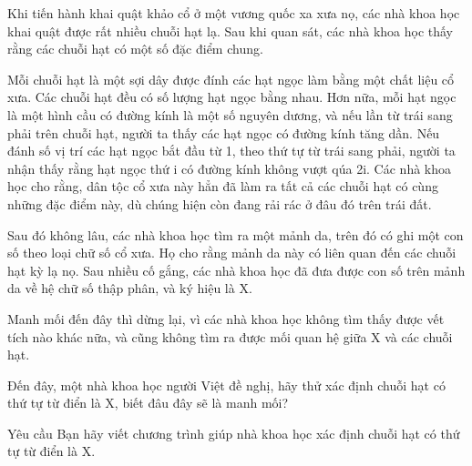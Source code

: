 Khi tiến hành khai quật khảo cổ ở một vương quốc xa xưa nọ, các nhà khoa học khai quật được rất nhiều chuỗi hạt lạ. Sau khi quan sát, các nhà khoa học thấy rằng các chuỗi hạt có một số đặc điểm chung.  

   Mỗi chuỗi hạt là một sợi dây được đính các hạt ngọc làm bằng một chất liệu cổ xưa. Các chuỗi hạt đều có số lượng hạt ngọc bằng nhau. Hơn nữa, mỗi hạt ngọc là một hình cầu có đường kính là một số nguyên dương, và nếu lần từ trái sang phải trên chuỗi hạt, người ta thấy các hạt ngọc có đường kính tăng dần. Nếu đánh số vị trí các hạt ngọc bắt đầu từ 1, theo thứ tự từ trái sang phải, người ta nhận thấy rằng hạt ngọc thứ i có đường kính không vượt qúa 2i. Các nhà khoa học cho rằng, dân tộc cổ xưa này hẳn đã làm ra tất cả các chuỗi hạt có cùng những đặc điểm này, dù chúng hiện còn đang rải rác ở đâu đó trên trái đất.  

   Sau đó không lâu, các nhà khoa học tìm ra một mảnh da, trên đó có ghi một con số theo loại chữ số cổ xưa. Họ cho rằng mảnh da này có liên quan đến các chuỗi hạt kỳ lạ nọ. Sau nhiều cố gắng, các nhà khoa học đã đưa được con số trên mảnh da về hệ chữ số thập phân, và ký hiệu là X.  

   Manh mối đến đây thì dừng lại, vì các nhà khoa học không tìm thấy được vết tích nào khác nữa, và cũng không tìm ra được mối quan hệ giữa X và các chuỗi hạt.  

   Đến đây, một nhà khoa học người Việt đề nghị, hãy thử xác định chuỗi hạt có thứ tự từ điển là X, biết đâu đây sẽ là manh mối?  

Yêu cầu
Bạn hãy viết chương trình giúp nhà khoa học xác định chuỗi hạt có thứ tự từ điển là X.